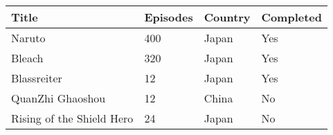 \documentclass{article}%
\begin{document}
%
\normalsize%
\begin{tabular}{|l|l|l|l|}%
\hline%
Title& Episodes& Country& Completed\\%
\hline%
Naruto& 400& Japan& Yes\\%
\hline%
Bleach& 320& Japan& Yes\\%
\hline%
Blassreiter& 12& Japan& Yes\\%
\hline%
QuanZhi Ghaoshou& 12& China& No\\%
\hline%
Rising of the Shield Hero& 24& Japan& No\\%
\hline%
\end{tabular}%
\end{document}
